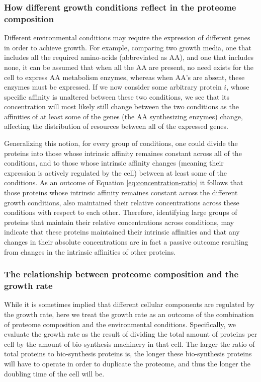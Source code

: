 \documentclass[notitlepage]{article}
\begin{document}
\subsubsection{How different growth conditions reflect in the proteome composition}
Different environmental conditions may require the expression of different genes in order to achieve growth.
For example, comparing two growth media, one that includes all the required amino-acids (abbreviated as AA), and one that includes none, it can be assumed that when all the AA are present, no need exists for the cell to express AA metabolism enzymes, whereas when AA's are absent, these enzymes must be expressed.
If we now consider some arbitrary protein $i$, whose specific affinity is unaltered between these two conditions, we see that its concentration will most likely still change between the two conditions as the affinities of at least some of the genes (the AA synthesizing enzymes) change, affecting the distribution of resources between all of the expressed genes.

Generalizing this notion, for every group of conditions, one could divide the proteins into those whose intrinsic affinity remaines constant across all of the conditions, and to those whose intrinsic affinity changes (meaning their expression is actively regulated by the cell) between at least some of the conditions.
As an outcome of Equation \ref{eq:concentration-ratio} it follows that those proteins whose intrinsic affinity remaines constant across the different growth conditions, also maintained their relative concentrations across these conditions with respect to each other.
Therefore, identifying large groups of proteins that maintain their relative concentrations across conditions, may indicate that these proteins maintained their intrinsic affinities and that any changes in their absolute concentrations are in fact a passive outcome resulting from changes in the intrinsic affinities of other proteins.

\subsubsection{The relationship between proteome composition and the growth rate}
While it is sometimes implied that different cellular components are regulated by the growth rate, here we treat the growth rate as an outcome of the combination of proteome composition and the environmental conditions.
Specifically, we evaluate the growth rate as the result of dividing the total amount of proteins per cell by the amount of bio-synthesis machinery in that cell.
The larger the ratio of total proteins to bio-synthesis proteins is, the longer these bio-synthesis proteins will have to operate in order to duplicate the proteome, and thus the longer the doubling time of the cell will be.
\end{document}
